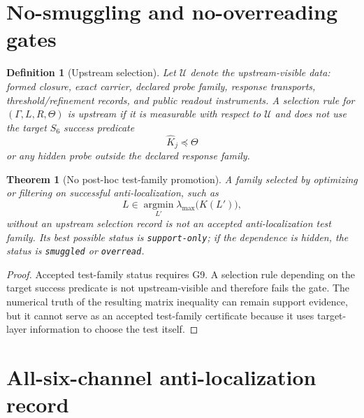 \documentclass[11pt]{article}
\newtheorem{theorem}{Theorem}
\newtheorem{definition}{Definition}
\newcommand{\Loewner}{\preceq}
\begin{document}
\section{No-smuggling and no-overreading gates}

\begin{definition}[Upstream selection]
Let $\mathcal U$ denote the upstream-visible data: formed closure, exact carrier, declared probe family, response transports, threshold/refinement records, and public readout instruments.  A selection rule for $(\Gamma,L,R,\Theta)$ is upstream if it is measurable with respect to $\mathcal U$ and does not use the target $S_6$ success predicate
\[
  \widehat K_j\Loewner\Theta
\]
or any hidden probe outside the declared response family.
\end{definition}

\begin{theorem}[No post-hoc test-family promotion]
A family selected by optimizing or filtering on successful anti-localization, such as
\[
  L\in\operatorname*{argmin}_{L'}\lambda_{\max}\bigl(K(L')\bigr),
\]
without an upstream selection record is not an accepted anti-localization test family.  Its best possible status is \texttt{support-only}; if the dependence is hidden, the status is \texttt{smuggled} or \texttt{overread}.
\end{theorem}

\begin{proof}
Accepted test-family status requires G9.  A selection rule depending on the target success predicate is not upstream-visible and therefore fails the gate.  The numerical truth of the resulting matrix inequality can remain support evidence, but it cannot serve as an accepted test-family certificate because it uses target-layer information to choose the test itself.
\end{proof}

\section{All-six-channel anti-localization record}
\end{document}
